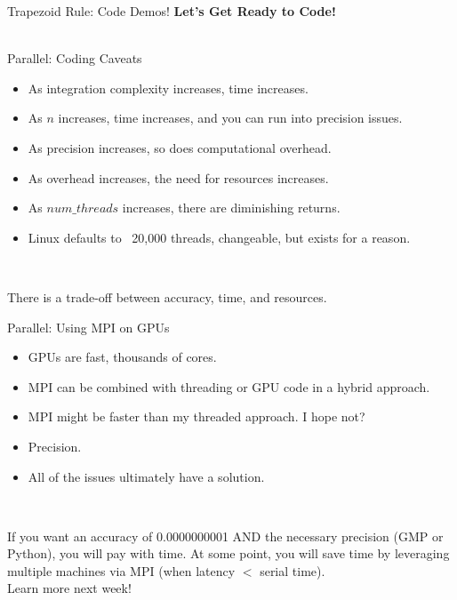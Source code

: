 \documentclass[t]{beamer}
\begin{document}
\begin{frame}{Trapezoid Rule: Code Demos!}
\center
\Large\textbf{Let's Get Ready to Code!} \\ \, \\

\end{frame}

\begin{frame}{Parallel: Coding Caveats}
	\begin{itemize}
		\item As integration complexity increases, time increases.
		\item As $n$ increases, time increases, and you can run into precision issues.
		\item As precision increases, so does computational overhead.
		\item As overhead increases, the need for resources increases.
		\item As $num\_threads$ increases, there are diminishing returns.
		\item Linux defaults to ~20,000 threads, changeable, but exists for a reason.
	\end{itemize} \,

	\center
	\hspace{-1em}There is a trade-off between accuracy, time, and resources.
\end{frame}

\begin{frame}{Parallel: Using MPI on GPUs}
	\begin{itemize}
		\item GPUs are fast, thousands of cores.
		\item MPI can be combined with threading or GPU code in a hybrid approach.
		\item MPI might be faster than my threaded approach.  I hope not?
		\item Precision.
		\item All of the issues ultimately have a solution.
	\end{itemize} \,

	If you want an accuracy of 0.0000000001 AND the necessary precision (GMP or Python),
	you will pay with time. At some point, you will save time by leveraging multiple
	machines via MPI (when latency $<$ serial time). \\

	\center
	Learn more next week!
\end{frame}
\end{document}
